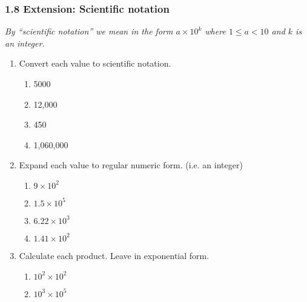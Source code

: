

\fancyhead[LE]{\thepage}



\subsubsection*{1.8 Extension: Scientific notation}
\emph{By ``scientific notation'' we mean in the form $a \times 10^{k}$ where $1\leq a <10$ and $k$ is an integer.}
\begin{enumerate}
\item Convert each value to scientific notation.
  \begin{multicols}{2}
    \begin{enumerate}[itemsep=1cm]
      \item 5000
      \item 12,000
      \item 450
      \item 1,060,000
    \end{enumerate}
  \end{multicols} \vspace{1cm}

\item Expand each value to regular numeric form. (i.e. an integer)
  \begin{multicols}{2}
    \begin{enumerate}[itemsep=1cm]
      \item $9 \times 10^{2}$
      \item $1.5 \times 10^{5}$
      \item $6.22 \times 10^{3}$
      \item $1.41 \times 10^{2}$
    \end{enumerate}
  \end{multicols} \vspace{1cm}

\item Calculate each product. Leave in exponential form.
  \begin{multicols}{2}
    \begin{enumerate}[itemsep=1cm]
      \item $10^{2} \times 10^{2}$
      \item $10^{3} \times 10^{5}$
    \end{enumerate}
  \end{multicols} \vspace{1cm}


\end{enumerate}
